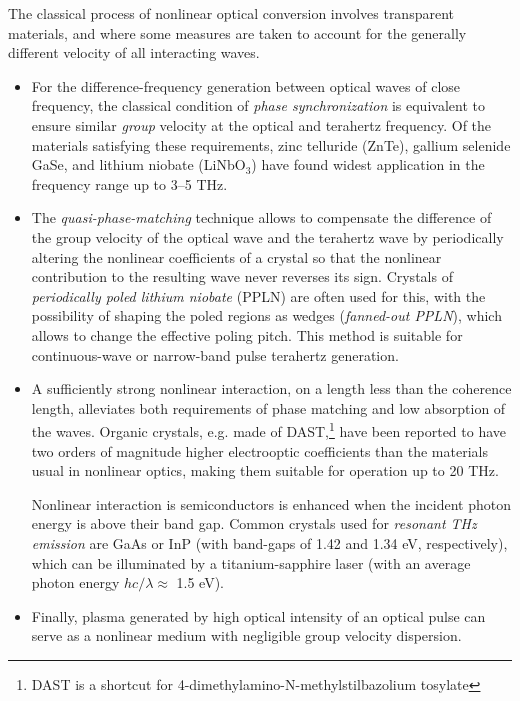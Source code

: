 The classical process of nonlinear optical conversion involves transparent materials, and where some measures are taken to account for the generally different velocity of all interacting waves.
\begin{itemize}
\item{For the difference-frequency generation between optical waves of close frequency, the classical condition of \textit{phase synchronization} is equivalent to ensure similar \textit{group} velocity at the optical and terahertz frequency. Of the materials satisfying these requirements, zinc telluride (ZnTe), gallium selenide GaSe, and lithium niobate (LiNbO$_{3}$) have found widest application in the frequency range up to 3--5 THz. } 
\item{The \textit{quasi-phase-matching} technique allows to compensate the difference of the group velocity of the optical wave and the terahertz wave by periodically altering the nonlinear coefficients of a crystal so that the nonlinear contribution to the resulting wave never reverses its sign. Crystals of \textit{periodically poled lithium niobate} (PPLN) are often used for this, with the possibility of shaping the poled regions as wedges (\textit{fanned-out PPLN}), which allows to change the effective poling pitch. This method is suitable for continuous-wave or narrow-band pulse terahertz generation.  }  %
\item{A sufficiently strong nonlinear interaction, on a length less than the coherence length, alleviates both requirements of phase matching and low absorption of the waves. Organic crystals, e.g. made of DAST,\footnote{DAST is a shortcut for 4-dimethylamino-N-methylstilbazolium tosylate} have been reported\cite{han2000use} to have two orders of magnitude higher electrooptic coefficients than the materials usual in nonlinear optics, making them suitable for operation up to 20 THz. 

Nonlinear interaction is semiconductors is enhanced when the incident photon energy is above their band gap. Common crystals used for \textit{resonant THz emission} are GaAs or InP 
(with band-gaps of 1.42 and 1.34 eV, respectively), which can be illuminated by a
 titanium-sapphire laser (with an average photon energy $hc/\lambda \approx$ 1.5 eV).
 } 
\item{Finally, plasma generated by high optical intensity of an optical pulse can serve as a nonlinear medium with negligible group velocity dispersion.}
 \end{itemize}



